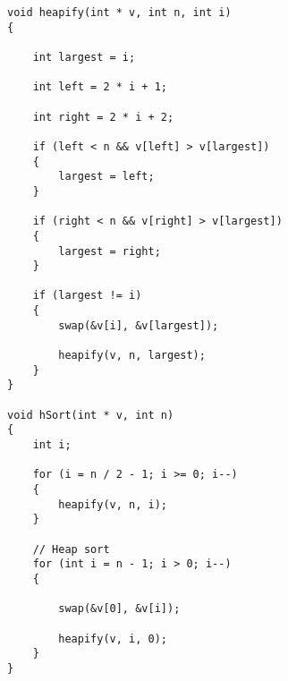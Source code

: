 \begin{lstlisting}[style=CStyle]
void heapify(int * v, int n, int i)
{

    int largest = i;

    int left = 2 * i + 1;

    int right = 2 * i + 2;

    if (left < n && v[left] > v[largest])
    {
        largest = left;
    }

    if (right < n && v[right] > v[largest])
    {
        largest = right;
    }

    if (largest != i)
    {
        swap(&v[i], &v[largest]);

        heapify(v, n, largest);
    }
}

void hSort(int * v, int n)
{
    int i;

    for (i = n / 2 - 1; i >= 0; i--)
    {
        heapify(v, n, i);
    }

    // Heap sort
    for (int i = n - 1; i > 0; i--) 
    {

        swap(&v[0], &v[i]);

        heapify(v, i, 0);
    }
}
\end{lstlisting}